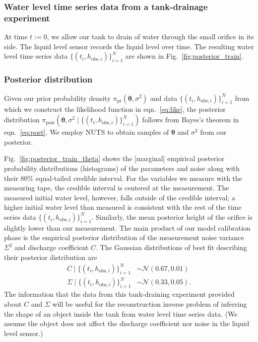 \documentclass[openacc]{rsproca_new}%
\newcommand\thedata {$\{(t_i,h_{\text{obs}, i})\}_{i=1}^{N}$\xspace}
\newcommand\thedatanomath {\{(t_i,h_{\text{obs}, i})\}_{i=1}^{N}}
\begin{document}
\subsubsection{Water level time series data from a tank-drainage experiment} At time $t:=0$, we allow our tank to drain of water through the small orifice in its side. The liquid level sensor records the liquid level over time. The resulting water level time series data \thedata are shown in Fig.~\ref{fig:posterior_train}.

\subsubsection{Posterior distribution}
Given our prior probability density $\pi_{\text{pr}}(\boldsymbol \theta, \sigma^2)$ and data \thedata from which we construct the likelihood function in eqn.~\ref{eq:like}, the posterior distribution $\pi_{\text{post}}(\boldsymbol \theta, \sigma^2 \mid \thedatanomath)$ follows from Bayes's theorem in eqn.~\ref{eq:post}. 
We employ NUTS to obtain samples of $\boldsymbol \theta$ and $\sigma^2$ from our posterior. 

Fig.~\ref{fig:posterior_train_theta} shows the [marginal] empirical posterior probability distributions (histograms) of the parameters and noise along with their 80\% equal-tailed credible interval. For the variables we measure with the measuring tape, the credible interval is centered at the measurement. The measured initial water level, however, falls outside of the credible interval; a higher initial water level than measured is consistent with the rest of the time series data \thedata. Similarly, the mean posterior height of the orifice is slightly lower than our measurement. 
The main product of our model calibration phase is the empirical posterior distribution of the measurement noise variance $\Sigma^2$ and discharge coefficient $C$. 
The Gaussian distributions of best fit describing their posterior distribution are
\begin{align}
C \mid \thedatanomath & \sim \mathcal{N}(0.67, 0.01) \\
\Sigma \mid \thedatanomath & \sim \mathcal{N}(0.33, 0.05).
\end{align}
The information that the data from this tank-draining experiment provided about $C$ and $\Sigma$ will be useful for the reconstruction inverse problem of inferring the shape of an object inside the tank from water level time series data. (We assume the object does not affect the discharge coefficient nor noise in the liquid level sensor.)
\end{document}
